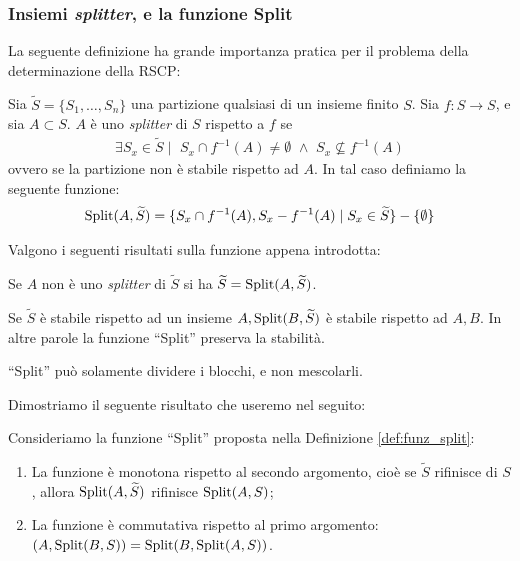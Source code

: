 \subsubsection{Insiemi \emph{splitter}, e la funzione Split}
La seguente definizione ha grande importanza pratica per il problema della determinazione della RSCP:
\begin{definition}
    \label{def:funz_split}
    Sia $\widetilde{S} = \{S_1,\dots,S_n\}$ una partizione qualsiasi di un insieme finito $S$. Sia $f: S \to S$, e sia $A \subset S$. $A$ è uno \emph{splitter} di $S$ rispetto a $f$ se
    \begin{gather*}
        \exists S_x \in \widetilde{S} \mid \,\, S_x \cap f^{-1}(A) \neq \emptyset \,\,\land\,\, S_x \not\subseteq f^{-1}(A)
    \end{gather*}
    ovvero se la partizione non è stabile rispetto ad $A$. In tal caso definiamo la seguente funzione:
    \begin{gather*}
        \textup{Split}(A,\widetilde{S}) = \{S_x \cap f^{-1}(A), S_x - f^{-1}(A) \mid S_x \in \widetilde{S}\} - \{\emptyset\}
    \end{gather*}
\end{definition}
Valgono i seguenti risultati sulla funzione appena introdotta:
\begin{observation}
    Se $A$ non è uno \emph{splitter} di $\widetilde{S}$ si ha $\widetilde{S} = \textup{Split}(A,\widetilde{S})$.
\end{observation}
\begin{proposition}
    \label{prop:split_eredita}
    Se $\widetilde{S}$ è stabile rispetto ad un insieme $A, \textup{Split}(B,\widetilde{S})$ è stabile rispetto ad $A,B$. In altre parole la funzione ``Split'' preserva la stabilità.
\end{proposition}
\begin{proof2}
    ``Split'' può solamente dividere i blocchi, e non mescolarli.
\end{proof2}
Dimostriamo il seguente risultato che useremo nel seguito:
\begin{theorem}
    \label{theo:split_properties}
    Consideriamo la funzione ``Split'' proposta nella Definizione \ref{def:funz_split}:
    \begin{enumerate}
        \item La funzione è monotona rispetto al secondo argomento, cioè se $\widetilde{S}$ rifinisce di $S$, allora $\textup{Split}(A,\widetilde{S})$ rifinisce $\textup{Split}(A,S)$;
        \item La funzione è commutativa rispetto al primo argomento: \splitfunc$(A,\textup{Split}(B,S)) = \textup{Split}(B, \textup{Split}(A,S))$.
    \end{enumerate}
\end{theorem}

